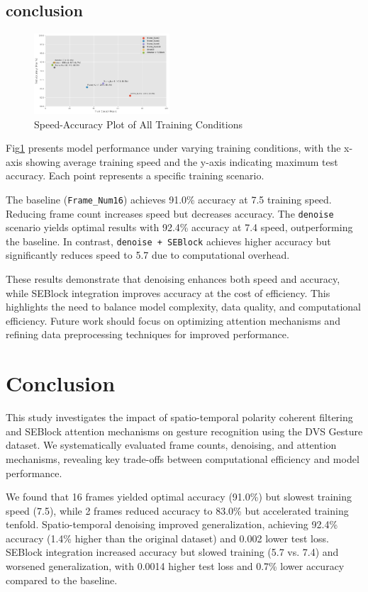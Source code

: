 \documentclass[conference]{IEEEtran}
\begin{document}
\subsection{conclusion}
\begin{figure}[htbp]
    \centering
    \includegraphics[width=0.45\textwidth]{figure/acc_speed.png}
    \caption{Speed-Accuracy Plot of All Training Conditions}
    \label{fig:acc_speed_all}
\end{figure}
Fig\ref{fig:acc_speed_all} presents model performance under varying training conditions, with the x-axis showing average training speed and the y-axis indicating maximum test accuracy. Each point represents a specific training scenario.

The baseline (\texttt{Frame\_Num16}) achieves 91.0\% accuracy at 7.5 training speed. Reducing frame count increases speed but decreases accuracy. The \texttt{denoise} scenario yields optimal results with 92.4\% accuracy at 7.4 speed, outperforming the baseline. In contrast, \texttt{denoise + SEBlock} achieves higher accuracy but significantly reduces speed to 5.7 due to computational overhead.

These results demonstrate that denoising enhances both speed and accuracy, while SEBlock integration improves accuracy at the cost of efficiency. This highlights the need to balance model complexity, data quality, and computational efficiency. Future work should focus on optimizing attention mechanisms and refining data preprocessing techniques for improved performance.

\section{Conclusion}
This study investigates the impact of spatio-temporal polarity coherent filtering and SEBlock attention mechanisms on gesture recognition using the DVS Gesture dataset. We systematically evaluated frame counts, denoising, and attention mechanisms, revealing key trade-offs between computational efficiency and model performance.

We found that 16 frames yielded optimal accuracy (91.0\%) but slowest training speed (7.5), while 2 frames reduced accuracy to 83.0\% but accelerated training tenfold. Spatio-temporal denoising improved generalization, achieving 92.4\% accuracy (1.4\% higher than the original dataset) and 0.002 lower test loss. SEBlock integration increased accuracy but slowed training (5.7 vs. 7.4) and worsened generalization, with 0.0014 higher test loss and 0.7\% lower accuracy compared to the baseline.
\end{document}
